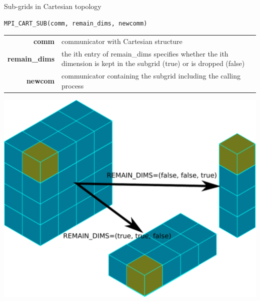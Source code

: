 \documentclass[aspectratio=43]{beamer}
\begin{document}
\begin{frame}[fragile]{Sub-grids in Cartesian topology}
\footnotesize
\vspace{-1.3cm}
\begin{verbatim}
MPI_CART_SUB(comm, remain_dims, newcomm)
\end{verbatim}
\vspace{-0.2cm}
\begin{black1block}{}
\begin{tabular}{rp{8cm}}
\textbf{comm} & communicator with Cartesian structure\\
\textbf{remain\_dims} & the ith entry of remain\_dims specifies whether the ith dimension is kept in the subgrid (true) or is dropped (false)\\
\textbf{newcom} & communicator containing the subgrid including the calling process\\
\end{tabular}
\end{black1block}
\vspace{-0.4cm}
\begin{center}
\includegraphics[scale=0.36]{04.MPI_Topo/subgrid.pdf}
\end{center}
\vspace{-2cm}
\end{frame}
\end{document}
